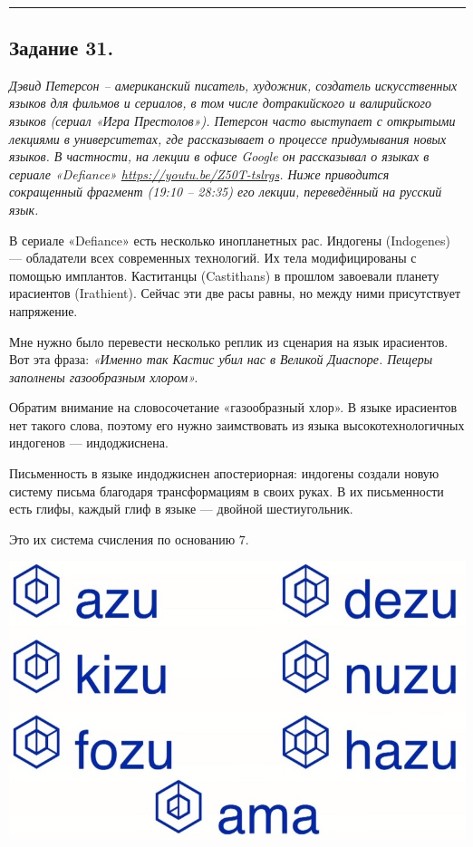 \\
\rule[0.5\baselineskip]{\textwidth}{1pt}

\vspace{0\baselineskip}

\subsection*{Задание 31.}
    \textit{Дэвид Петерсон – американский писатель, художник, создатель искусственных языков для фильмов и сериалов, в том числе дотракийского и валирийского языков (сериал «Игра Престолов»). Петерсон часто выступает с открытыми лекциями в университетах, где рассказывает о процессе придумывания новых языков. В частности, на лекции в офисе Google он рассказывал о языках в сериале «Defiance» \url{https://youtu.be/Z50T-tslrgs}. Ниже приводится сокращенный фрагмент (19:10 – 28:35) его лекции, переведённый на русский язык.}
    
    В сериале «Defiance» есть несколько инопланетных рас. Индогены (Indogenes) — обладатели всех современных технологий. Их тела модифицированы с помощью имплантов. Каститанцы (Castithans) в прошлом завоевали планету ирасиентов (Irathient). Сейчас эти две расы равны, но между ними присутствует напряжение.
    
    Мне нужно было перевести несколько реплик из сценария на язык ирасиентов.  Вот эта фраза: \textit{«Именно так Кастис убил нас в Великой Диаспоре. Пещеры заполнены газообразным хлором».}
    
    Обратим внимание на словосочетание «газообразный хлор». В языке ирасиентов нет такого слова, поэтому его нужно заимствовать из языка высокотехнологичных индогенов — индоджиснена. 
    
    Письменность в языке индоджиснен апостериорная: индогены создали новую систему письма благодаря трансформациям в своих руках. В их письменности есть глифы, каждый глиф в языке — двойной шестиугольник. 
    
    Это их система счисления по основанию $7$.
    
    \begin{center}
    \includegraphics[scale=0.2]{lingua/image1-17.jpeg}
    \end{center}
    

